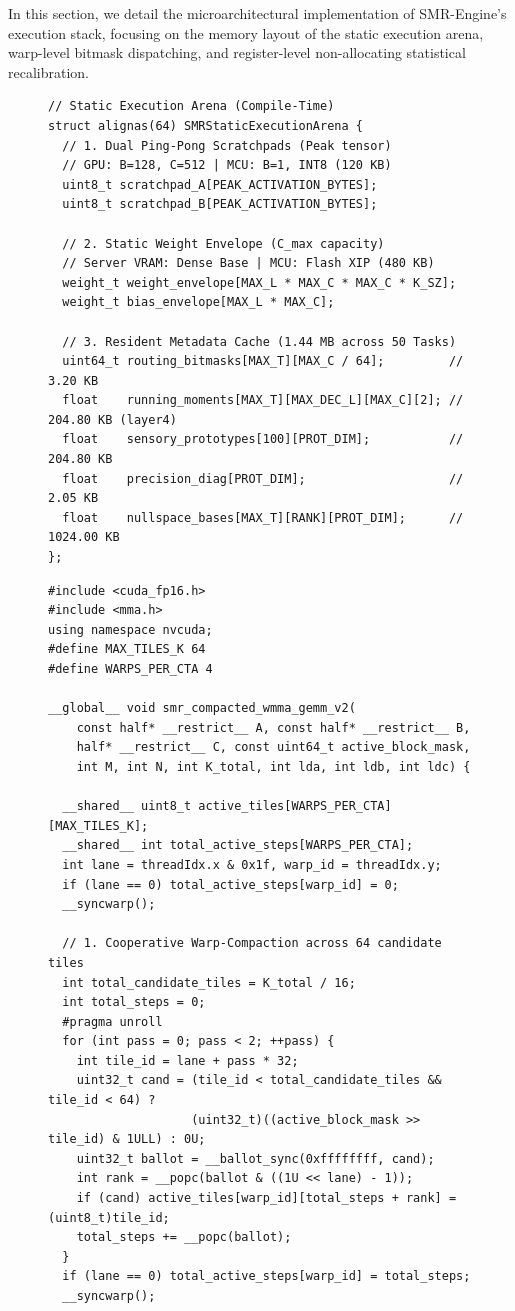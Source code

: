 \documentclass{article}
\begin{document}
In this section, we detail the microarchitectural implementation of SMR-Engine's execution stack, focusing on the memory layout of the static execution arena, warp-level bitmask dispatching, and register-level non-allocating statistical recalibration.

\begin{figure}[!t]
\centering
\begin{minipage}[t]{0.48\textwidth}
\begin{lstlisting}[style=structStyle]
// Static Execution Arena (Compile-Time)
struct alignas(64) SMRStaticExecutionArena {
  // 1. Dual Ping-Pong Scratchpads (Peak tensor)
  // GPU: B=128, C=512 | MCU: B=1, INT8 (120 KB)
  uint8_t scratchpad_A[PEAK_ACTIVATION_BYTES];
  uint8_t scratchpad_B[PEAK_ACTIVATION_BYTES];

  // 2. Static Weight Envelope (C_max capacity)
  // Server VRAM: Dense Base | MCU: Flash XIP (480 KB)
  weight_t weight_envelope[MAX_L * MAX_C * MAX_C * K_SZ];
  weight_t bias_envelope[MAX_L * MAX_C];

  // 3. Resident Metadata Cache (1.44 MB across 50 Tasks)
  uint64_t routing_bitmasks[MAX_T][MAX_C / 64];         // 3.20 KB
  float    running_moments[MAX_T][MAX_DEC_L][MAX_C][2]; // 204.80 KB (layer4)
  float    sensory_prototypes[100][PROT_DIM];           // 204.80 KB
  float    precision_diag[PROT_DIM];                    // 2.05 KB
  float    nullspace_bases[MAX_T][RANK][PROT_DIM];      // 1024.00 KB
};
\end{lstlisting}
\end{minipage}
\hfill
\begin{minipage}[t]{0.48\textwidth}
\begin{lstlisting}[style=cudaStyle]
#include <cuda_fp16.h>
#include <mma.h>
using namespace nvcuda;
#define MAX_TILES_K 64
#define WARPS_PER_CTA 4

__global__ void smr_compacted_wmma_gemm_v2(
    const half* __restrict__ A, const half* __restrict__ B,
    half* __restrict__ C, const uint64_t active_block_mask,
    int M, int N, int K_total, int lda, int ldb, int ldc) {

  __shared__ uint8_t active_tiles[WARPS_PER_CTA][MAX_TILES_K];
  __shared__ int total_active_steps[WARPS_PER_CTA];
  int lane = threadIdx.x & 0x1f, warp_id = threadIdx.y;
  if (lane == 0) total_active_steps[warp_id] = 0;
  __syncwarp();

  // 1. Cooperative Warp-Compaction across 64 candidate tiles
  int total_candidate_tiles = K_total / 16;
  int total_steps = 0;
  #pragma unroll
  for (int pass = 0; pass < 2; ++pass) {
    int tile_id = lane + pass * 32;
    uint32_t cand = (tile_id < total_candidate_tiles && tile_id < 64) ?
                    (uint32_t)((active_block_mask >> tile_id) & 1ULL) : 0U;
    uint32_t ballot = __ballot_sync(0xffffffff, cand);
    int rank = __popc(ballot & ((1U << lane) - 1));
    if (cand) active_tiles[warp_id][total_steps + rank] = (uint8_t)tile_id;
    total_steps += __popc(ballot);
  }
  if (lane == 0) total_active_steps[warp_id] = total_steps;
  __syncwarp();


\end{lstlisting}
\end{minipage}
\end{figure}
\end{document}

